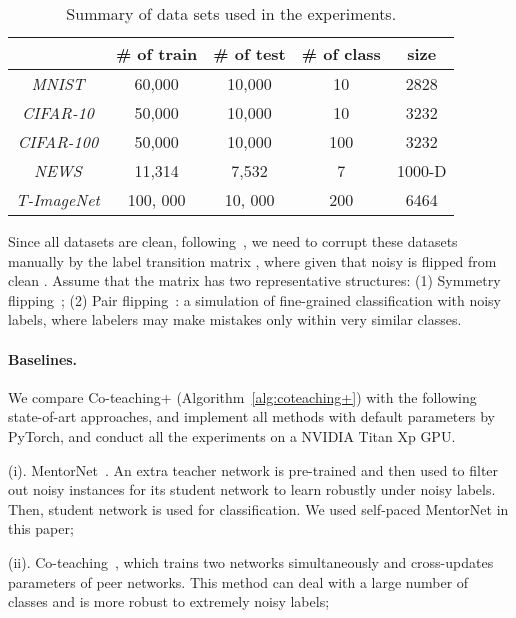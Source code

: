 \documentclass{article}
\begin{document}
\begin{table}[ht]\small
\centering
\vspace{-10px}
\caption{Summary of data sets used in the experiments.}
\footnotesize
\begin{tabular}{c | c | c | c | c}
	\hline
	         & \# of train & \# of test & \# of class & size  \\ \hline
	 \textit{MNIST}   & 60,000         & 10,000   & 10    & 2828 \\ \hline
	\textit{CIFAR-10}  & 50,000         & 10,000   & 10     & 3232 \\ \hline
	\textit{CIFAR-100}  & 50,000         & 10,000   & 100     & 3232 \\ \hline
	\textit{NEWS} & 11,314         & 7,532   & 7    & 1000-D \\ \hline
	\textit{T-ImageNet} & 100, 000       & 10, 000  & 200    & 6464 \\ \hline
\end{tabular}
\label{tab:dataset}
\end{table}

Since all datasets are clean, following~\cite{reed2014training,patrini2017making},
we need to corrupt these datasets manually by the label transition matrix , where  given that noisy  is flipped from clean . Assume that the matrix  has two representative structures:
(1) Symmetry flipping~\cite{van2015learning}; (2) Pair flipping~\cite{han2018coteaching}: a simulation of fine-grained classification with noisy labels, where labelers may make mistakes only within very similar classes.

\vspace{-5px}
\paragraph{Baselines.}
We compare Co-teaching+ (Algorithm~\ref{alg:coteaching+}) with the following state-of-art approaches, and implement all methods with default parameters by PyTorch, and conduct all the experiments on a NVIDIA Titan Xp GPU.


(i). MentorNet~\cite{jiang2018mentornet}.
An extra teacher network is pre-trained and then used to filter out noisy instances for its student network to learn robustly under noisy labels.
Then,
student network is used for classification. We used self-paced MentorNet in this paper;

(ii). Co-teaching~\cite{han2018coteaching}, which trains two networks simultaneously and cross-updates parameters of peer networks. This method can deal with a large number of classes and is more robust to extremely noisy labels;
\end{document}
